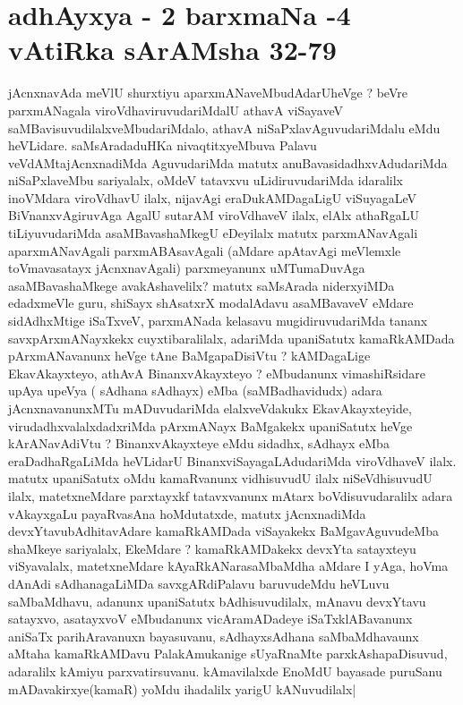
\section*{adhAyxya - 2 barxmaNa -4 vAtiRka sArAMsha 32-79}


\begin{artha}
jAcnxnavAda meVlU shurxtiyu aparxmANaveMbudAdarUheVge ? beVre
parxmANagala viroVdhaviruvudariMdalU athavA viSayaveV
saMBavisuvudilalxveMbudariMdalo, athavA niSaPxlavAguvudariMdalu eMdu
heVLidare. saMsAradaduHKa nivaqtitxyeMbuva Palavu veVdAMtajAcnxnadiMda
AguvudariMda matutx anuBavasidadhxvAdudariMda niSaPxlaveMbu
sariyalalx, oMdeV tatavxvu uLidiruvudariMda idaralilx inoVMdara
viroVdhavU ilalx, nijavAgi eraDukAMDagaLigU viSuyagaLeV
BiVnanxvAgiruvAga AgalU sutarAM viroVdhaveV ilalx, elAlx athaRgaLU
tiLiyuvudariMda asaMBavashaMkegU eDeyilalx matutx parxmANavAgali
aparxmANavAgali parxmABAsavAgali (aMdare apAtavAgi meVlemxle
toVmavasatayx jAcnxnavAgali) parxmeyanunx uMTumaDuvAga
asaMBavashaMkege avakAshavelilx? matutx saMsArada niderxyiMDa
edadxmeVle guru, shiSayx shAsatxrX modalAdavu asaMBavaveV eMdare
sidAdhxMtige iSaTxveV, parxmANada kelasavu mugidiruvudariMda tananx
savxpArxmANayxkekx cuyxtibaralilalx, adariMda upaniSatutx kamaRkAMDada
pArxmANavanunx heVge tAne BaMgapaDisiVtu ? kAMDagaLige EkavAkayxteyo,
athAvA BinanxvAkayxteyo ? eMbudanunx vimashiRsidare upAya upeVya (
sAdhana sAdhayx) eMba (saMBadhavidudx) adara jAcnxnavanunxMTu
mADuvudariMda elalxveVdakukx EkavAkayxteyide, virudadhxvalalxdadxriMda
pArxmANayx BaMgakekx upaniSatutx heVge kArANavAdiVtu ?
BinanxvAkayxteye eMdu sidadhx, sAdhayx eMba eraDadhaRgaLiMda heVLidarU
BinanxviSayagaLAdudariMda viroVdhaveV ilalx. matutx upaniSatutx oMdu
kamaRvanunx vidhisuvudU ilalx niSeVdhisuvudU ilalx, matetxneMdare
parxtayxkf tatavxvanunx mAtarx boVdisuvudaralilx adara vAkayxgaLu
payaRvasAna hoMdutatxde, matutx jAcnxnadiMda devxYtavubAdhitavAdare
kamaRkAMDada viSayakekx BaMgavAguvudeMba shaMkeye sariyalalx, EkeMdare
? kamaRkAMDakekx devxYta satayxteyu viSyavalalx, matetxneMdare
kAyaRkANarasaMbaMdha aMdare I yAga, hoVma dAnAdi sAdhanagaLiMDa
savxgARdiPalavu baruvudeMdu heVLuvu saMbaMdhavu, adanunx upaniSatutx
bAdhisuvudilalx, mAnavu devxYtavu satayxvo, asatayxvoV eMbudanunx
vicAramADadeye iSaTxklABavanunx aniSaTx parihAravanuxn bayasuvanu,
sAdhayxsAdhana saMbaMdhavaunx aMtaha kamaRkAMDavu PalakAmukanige
sUyaRnaMte parxkAshapaDisuvud, adaralilx  kAmiyu parxvatirsuvanu.
kAmavilalxde EnoMdU bayasade puruSanu mADavakirxye(kamaR) yoMdu
ihadalilx yarigU kANuvudilalx|
\end{artha}

